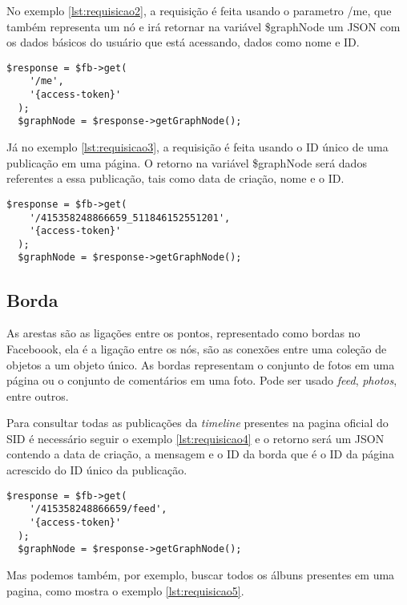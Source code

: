 No exemplo \ref{lst:requisicao2}, a requisição é feita usando o parametro /me, que também representa um nó e irá retornar na variável \$graphNode um JSON com os dados básicos do usuário que está acessando, dados como nome e ID.

\begin{lstlisting}[caption={Requisitando dados básicos de um usuário},label={lst:requisicao2}]
  $response = $fb->get(
    '/me',
    '{access-token}'
  );
  $graphNode = $response->getGraphNode();
\end{lstlisting}

Já no exemplo \ref{lst:requisicao3}, a requisição é feita usando o ID único de uma publicação em uma página. O retorno na variável \$graphNode será dados referentes a essa publicação, tais como data de criação, nome e o ID.

\begin{lstlisting}[caption={Requisitando dados básicos de uma publicação},label={lst:requisicao3}]
  $response = $fb->get(
    '/415358248866659_511846152551201',
    '{access-token}'
  );
  $graphNode = $response->getGraphNode();
\end{lstlisting}

\subsection{Borda}
As arestas são as ligações entre os pontos, representado como bordas no Faceboook, ela é a ligação entre os nós, são as conexões entre uma coleção de objetos a um objeto único. As bordas representam o conjunto de fotos em uma página ou o conjunto de comentários em uma foto. Pode ser usado \textit{feed}, \textit{photos}, entre outros.

Para consultar todas as publicações da \textit{timeline} presentes na pagina oficial do SID é necessário seguir o exemplo \ref{lst:requisicao4} e o retorno será um JSON contendo a data de criação, a mensagem e o ID da borda que é o ID da página acrescido do ID único da publicação.

\begin{lstlisting}[caption={Requisitando todas as publicações de uma página},label={lst:requisicao4}]
  $response = $fb->get( 
    '/415358248866659/feed', 
    '{access-token}'
  );
  $graphNode = $response->getGraphNode();
\end{lstlisting}

Mas podemos também, por exemplo, buscar todos os álbuns presentes em uma pagina, como mostra o exemplo \ref{lst:requisicao5}.

